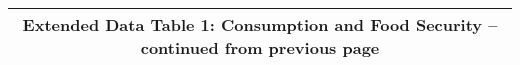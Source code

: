 \begin{longtable}{llcccccccccc}
\multicolumn{12}{c}{{\bfseries Extended Data Table 1: Consumption and Food Security -- continued from previous page}} \\ \hline                                                                                                                                                                                                                                                                                                                                                                                                                                                                                                                                                                                                                                                                                                                                                                                   

\end{longtable}
